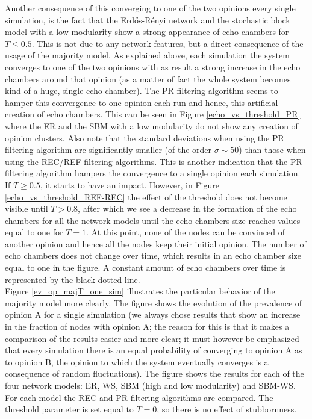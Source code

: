 \documentclass[11 pt , letterpaper , twoside , openright]{book}
\begin{document}
Another consequence of this converging to one of the two opinions every single simulation, is the fact that the Erd\H{o}s-R\'{e}nyi network and the stochastic block model with a low modularity show a strong appearance of echo chambers for $T \leqslant 0.5$. This is not due to any network features, but a direct consequence of the usage of the majority model. As explained above, each simulation the system converges to one of the two opinions with as result a strong increase in the echo chambers around that opinion (as a matter of fact the whole system becomes kind of a huge, single echo chamber). The PR filtering algorithm seems to hamper this convergence to one opinion each run and hence, this artificial creation of echo chambers. This can be seen in Figure \ref{echo_vs_threshold_PR} where the ER and the SBM with a low modularity do not show any creation of opinion clusters. Also note that the standard deviations when using the PR filtering algorithm are significantly smaller (of the order $\sigma \sim 50$) than those when using the REC/REF filtering algorithms. This is another indication that the PR filtering algorithm hampers the convergence to a single opinion each simulation. If $T \geqslant 0.5$, it starts to have an impact. However, in Figure \ref{echo_vs_threshold_REF-REC} the effect of the threshold does not become visible until $T > 0.8$, after which we see a decrease in the formation of the echo chambers for all the network models until the echo chambers size reaches values equal to one for $T=1$. At this point, none of the nodes can be convinced of another opinion and hence all the nodes keep their initial opinion. The number of echo chambers does not change over time, which results in an echo chamber size equal to one in the figure. A constant amount of echo chambers over time is represented by the black dotted line.\\
\newline
Figure \ref{ev_op_majT_one_sim} illustrates the particular behavior of the majority model more clearly. The figure shows the evolution of the prevalence of opinion A for a single simulation (we always chose results that show an increase in the fraction of nodes with opinion A; the reason for this is that it makes a comparison of the results easier and more clear; it must however be emphasized that every simulation there is an equal probability of converging to opinion A as to opinion B, the opinion to which the system eventually converges is a consequence of random fluctuations). The figure shows the results for each of the four network models: ER, WS, SBM (high and low modularity) and SBM-WS. For each model the REC and PR filtering algorithms are compared. The threshold parameter is set equal to $T=0$, so there is no effect of stubbornness.\\
\end{document}
